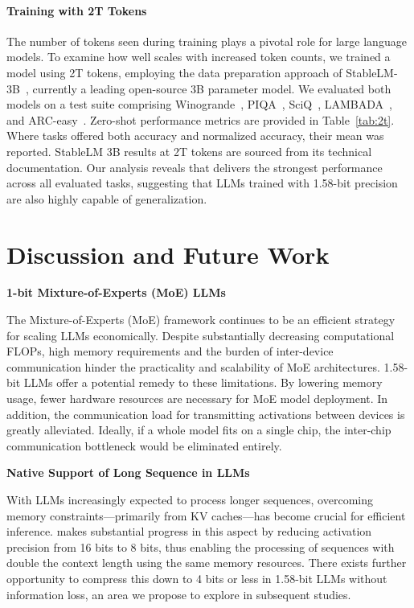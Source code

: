 \paragraph{Training with 2T Tokens}

The number of tokens seen during training plays a pivotal role for large language models. To examine how well  scales with increased token counts, we trained a  model using 2T tokens, employing the data preparation approach of StableLM-3B~\cite{StableLM-3B-4E1T}, currently a leading open-source 3B parameter model. We evaluated both models on a test suite comprising Winogrande~\cite{winoGrande}, PIQA~\cite{piqa}, SciQ~\cite{sciq}, LAMBADA~\cite{lambada}, and ARC-easy~\cite{arc}. Zero-shot performance metrics are provided in Table~\ref{tab:2t}. Where tasks offered both accuracy and normalized accuracy, their mean was reported. StableLM 3B results at 2T tokens are sourced from its technical documentation. Our analysis reveals that  delivers the strongest performance across all evaluated tasks, suggesting that LLMs trained with 1.58-bit precision are also highly capable of generalization.

\section{Discussion and Future Work}

\textbf{1-bit Mixture-of-Experts (MoE) LLMs}

The Mixture-of-Experts (MoE) framework continues to be an efficient strategy for scaling LLMs economically. Despite substantially decreasing computational FLOPs, high memory requirements and the burden of inter-device communication hinder the practicality and scalability of MoE architectures. 1.58-bit LLMs offer a potential remedy to these limitations. By lowering memory usage, fewer hardware resources are necessary for MoE model deployment. In addition, the communication load for transmitting activations between devices is greatly alleviated. Ideally, if a whole model fits on a single chip, the inter-chip communication bottleneck would be eliminated entirely.

\textbf{Native Support of Long Sequence in LLMs}

With LLMs increasingly expected to process longer sequences, overcoming memory constraints—primarily from KV caches—has become crucial for efficient inference.  makes substantial progress in this aspect by reducing activation precision from 16 bits to 8 bits, thus enabling the processing of sequences with double the context length using the same memory resources. There exists further opportunity to compress this down to 4 bits or less in 1.58-bit LLMs without information loss, an area we propose to explore in subsequent studies.

